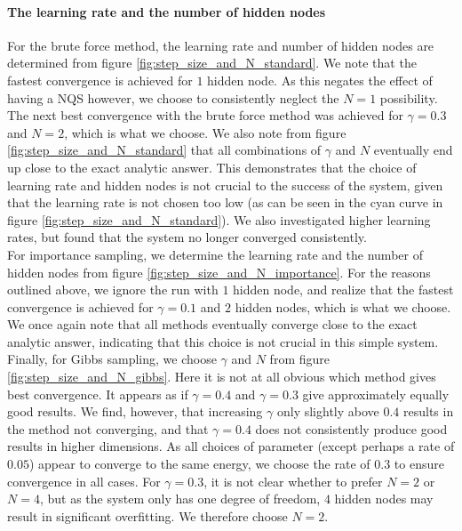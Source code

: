 \documentclass[a4paper, 10pt]{article}
\begin{document}
\paragraph{The learning rate and the number of hidden nodes}
For the brute force method, the learning rate and number of hidden nodes are determined from figure \ref{fig:step_size_and_N_standard}.  We note that the fastest convergence is achieved for $1$ hidden node. As this negates the effect of having a NQS however, we choose to consistently neglect the $N=1$ possibility. The next best convergence with the brute force method was achieved for $\gamma=0.3$ and $N=2$, which is what we choose. We also note from figure \ref{fig:step_size_and_N_standard} that all combinations of $\gamma$ and $N$ eventually end up close to the exact analytic answer. This demonstrates that the choice of learning rate and hidden nodes is not crucial to the success of the system, given that the learning rate is not chosen too low (as can be seen in the cyan curve in figure \ref{fig:step_size_and_N_standard}). We also investigated higher learning rates, but found that the system no longer converged consistently.\\
\linebreak
For importance sampling, we determine the learning rate and the number of hidden nodes from figure \ref{fig:step_size_and_N_importance}. For the reasons outlined above, we ignore the run with $1$ hidden node, and realize that the fastest convergence is achieved for $\gamma=0.1$ and $2$ hidden nodes, which is what we choose. We once again note that all methods eventually converge close to the exact analytic answer, indicating that this choice is not crucial in this simple system.\\
\linebreak
Finally, for Gibbs sampling, we choose $\gamma$ and $N$ from figure \ref{fig:step_size_and_N_gibbs}. Here it is not at all obvious which method gives best convergence. It appears as if $\gamma=0.4$ and $\gamma=0.3$ give approximately equally good results. We find, however, that increasing $\gamma$ only slightly above $0.4$ results in the method not converging, and that $\gamma=0.4$ does not consistently produce good results in higher dimensions. As all choices of parameter (except perhaps a rate of $0.05$) appear to converge to the same energy, we choose the rate of $0.3$ to ensure convergence in  all cases. For $\gamma=0.3$, it is not clear whether to prefer $N=2$ or $N=4$, but as the system only has one degree of freedom, $4$ hidden nodes may result in significant overfitting. We therefore choose $N=2$.
\end{document}
